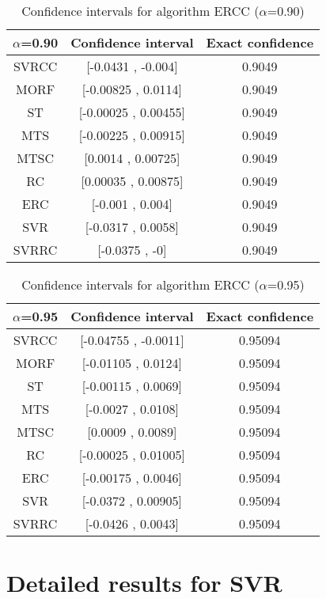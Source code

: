 \documentclass[a4paper,10pt]{article}
\begin{document}
\begin{table}[!htp]
\centering\small
\begin{tabular}{
|c|c|c|}
\hline
 $\alpha$=0.90 & Confidence interval & Exact confidence \\ \hline 
SVRCC & [-0.0431 , -0.004] & 0.9049\\ \hline 
MORF & [-0.00825 , 0.0114] & 0.9049\\ \hline 
ST & [-0.00025 , 0.00455] & 0.9049\\ \hline 
MTS & [-0.00225 , 0.00915] & 0.9049\\ \hline 
MTSC & [0.0014 , 0.00725] & 0.9049\\ \hline 
RC & [0.00035 , 0.00875] & 0.9049\\ \hline 
ERC & [-0.001 , 0.004] & 0.9049\\ \hline 
SVR & [-0.0317 , 0.0058] & 0.9049\\ \hline 
SVRRC & [-0.0375 , -0] & 0.9049\\ \hline 

\end{tabular}
\caption{Confidence intervals for algorithm ERCC ($\alpha$=0.90)}
\end{table}
\begin{table}[!htp]
\centering\small
\begin{tabular}{
|c|c|c|}
\hline
 $\alpha$=0.95 & Confidence interval & Exact confidence \\ \hline 
SVRCC & [-0.04755 , -0.0011] & 0.95094\\ \hline 
MORF & [-0.01105 , 0.0124] & 0.95094\\ \hline 
ST & [-0.00115 , 0.0069] & 0.95094\\ \hline 
MTS & [-0.0027 , 0.0108] & 0.95094\\ \hline 
MTSC & [0.0009 , 0.0089] & 0.95094\\ \hline 
RC & [-0.00025 , 0.01005] & 0.95094\\ \hline 
ERC & [-0.00175 , 0.0046] & 0.95094\\ \hline 
SVR & [-0.0372 , 0.00905] & 0.95094\\ \hline 
SVRRC & [-0.0426 , 0.0043] & 0.95094\\ \hline 

\end{tabular}
\caption{Confidence intervals for algorithm ERCC ($\alpha$=0.95)}
\end{table}

 \clearpage 


\section{Detailed results for SVR}
\end{document}
